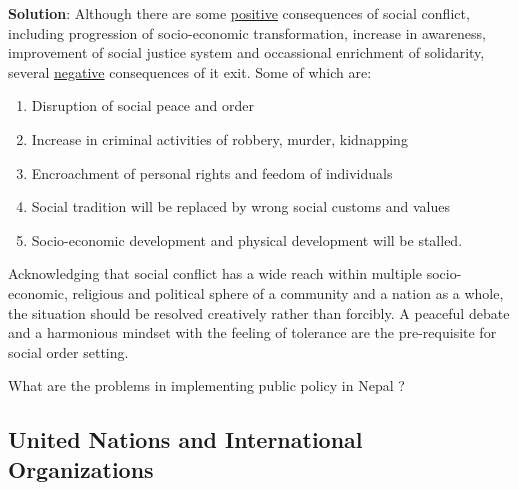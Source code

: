 \documentclass[
]{book}
\newcommand{\question}{\item}
\newenvironment{solution}{ {\bfseries Solution}:}{}
\begin{document}
\begin{questions}
\begin{solution}
Although there are some \underline{positive} consequences of social conflict, including progression of socio-economic transformation, increase in awareness, improvement of social justice system and occassional enrichment of solidarity, several \underline{negative} consequences of it exit. Some of which are:
\begin{enumerate}
\item Disruption of social peace and order
\item Increase in criminal activities of robbery, murder, kidnapping
\item Encroachment of personal rights and feedom of individuals
\item Social tradition will be replaced by wrong social customs and values
\item Socio-economic development and physical development will be stalled.
\end{enumerate}

Acknowledging that social conflict has a wide reach within multiple socio-economic, religious and political sphere of a community and a nation as a whole, the situation should be resolved creatively rather than forcibly. A peaceful debate and a harmonious mindset with the feeling of tolerance are the pre-requisite for social order setting.
\end{solution}

\question What are the problems in implementing public policy in Nepal ?

\end{questions}

\hypertarget{united-nations-and-international-organizations}{%
\subsection{United Nations and International Organizations}\label{united-nations-and-international-organizations}}
\end{document}
